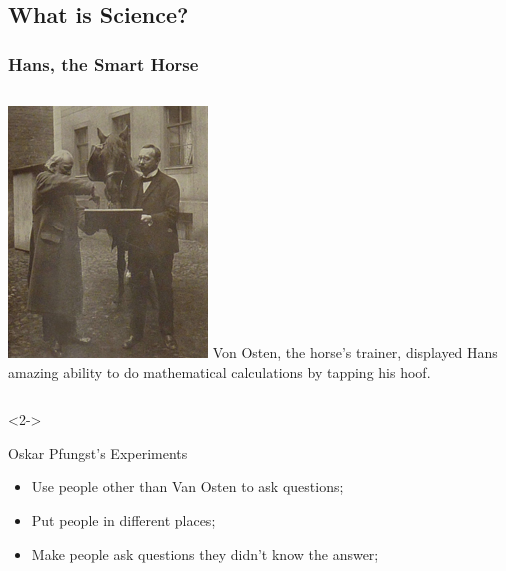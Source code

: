 \documentclass{beamer}
\begin{document}
\subsection{What is Science?}

\begin{frame}
  \frametitle{Hans, the Smart Horse}
  \begin{columns}[c]
    \includegraphics[width=\textwidth]{img/smarthorse}
    Von Osten, the horse's trainer, displayed Hans amazing ability to
    do mathematical calculations by tapping his hoof.
  \end{columns}
  \medskip
  
  \begin{onlyenv}<2->
    \begin{block}{Oskar Pfungst's Experiments}
      \begin{itemize}
      \item Use people other than Van Osten to ask questions;
      \item<3-> Put people in different places;
      \item<4-> Make people ask questions they didn't know the answer;
      \end{itemize}
    \end{block}
  \end{onlyenv}
\end{frame}
\end{document}
